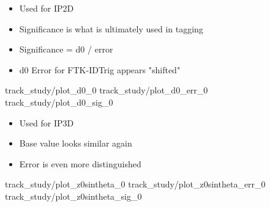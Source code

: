     { \begin{itemize}
        \item Used for IP2D
        \item Significance is what is ultimately used in tagging
        \item Significance = d0 / error
        \item d0 Error for FTK-IDTrig appears "shifted"
    \end{itemize} }
    {track_study/plot_d0_0}
    {track_study/plot_d0_err_0}
    {track_study/plot_d0_sig_0}
    { \begin{itemize}
        \item Used for IP3D
        \item Base value looks similar again
        \item Error is even more distinguished
    \end{itemize} }
    {track_study/plot_z0sintheta_0}
    {track_study/plot_z0sintheta_err_0}
    {track_study/plot_z0sintheta_sig_0}
